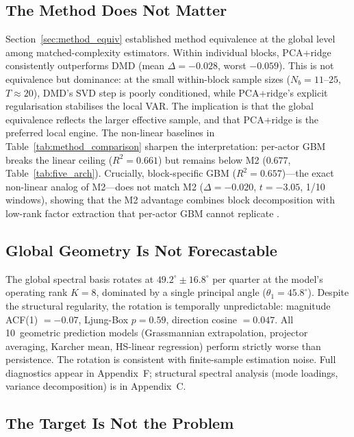 \documentclass[11pt,a4paper]{article}
\begin{document}
\subsection{The Method Does Not Matter}

Section~\ref{sec:method_equiv} established method equivalence at the global level among matched-complexity estimators. Within individual blocks, PCA+ridge consistently outperforms DMD (mean $\Delta = -0.028$, worst $-0.059$). This is not equivalence but dominance: at the small within-block sample sizes ($N_b = 11$--$25$, $T \approx 20$), DMD's SVD step is poorly conditioned, while PCA+ridge's explicit regularisation stabilises the local VAR. The implication is that the global equivalence reflects the larger effective sample, and that PCA+ridge is the preferred local engine. The non-linear baselines in Table~\ref{tab:method_comparison} sharpen the interpretation: per-actor GBM breaks the linear ceiling ($R^2 = 0.661$) but remains below M2 ($0.677$, Table~\ref{tab:five_arch}). Crucially, block-specific GBM ($R^2 = 0.657$)---the exact non-linear analog of M2---does not match M2 ($\Delta = -0.020$, $t = -3.05$, 1/10 windows), showing that the M2 advantage combines block decomposition with low-rank factor extraction that per-actor GBM cannot replicate \citep[cf.][for machine learning in asset pricing]{gu2020empirical}.

\subsection{Global Geometry Is Not Forecastable}

The global spectral basis rotates at $49.2^\circ \pm 16.8^\circ$ per quarter at the model's operating rank $K{=}8$, dominated by a single principal angle ($\theta_1 = 45.8^\circ$). Despite the structural regularity, the rotation is temporally unpredictable: magnitude ACF(1) $= -0.07$, Ljung-Box $p = 0.59$, direction cosine $= 0.047$. All 10~geometric prediction models (Grassmannian extrapolation, projector averaging, Karcher mean, HS-linear regression) perform strictly worse than persistence. The rotation is consistent with finite-sample estimation noise. Full diagnostics appear in Appendix~F; structural spectral analysis (mode loadings, variance decomposition) is in Appendix~C.

\subsection{The Target Is Not the Problem}
\end{document}
